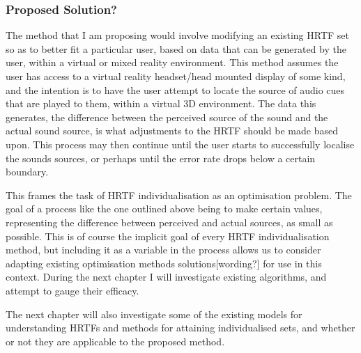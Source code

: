 \subsubsection{Proposed Solution?}
The method that I am proposing would involve modifying an existing HRTF set so as to better fit a particular user, based on data that can be generated by the user, within a virtual or mixed reality environment. This method assumes the user has access to a virtual reality headset/head mounted display of some kind, and the intention is to have the user attempt to locate the source of audio cues that are played to them, within a virtual 3D environment. The data this generates, the difference between the perceived source of the sound and the actual sound source, is what adjustments to the HRTF should be made based upon. This process may then continue until the user starts to successfully localise the sounds sources, or perhaps until the error rate drops below a certain boundary. 

This frames the task of HRTF individualisation as an optimisation problem. The goal of a process like the one outlined above being to make certain values, representing the difference between perceived and actual sources, as small as possible. This is of course the implicit goal of every HRTF individualisation method, but including it as a variable in the process allows us to consider adapting existing optimisation methods solutions[wording?] for use in this context. During the next chapter I will investigate existing algorithms, and attempt to gauge their efficacy. 

The next chapter will also investigate some of the existing models for understanding HRTFs and methods for attaining individualised sets, and whether or not they are applicable to the proposed method. 




